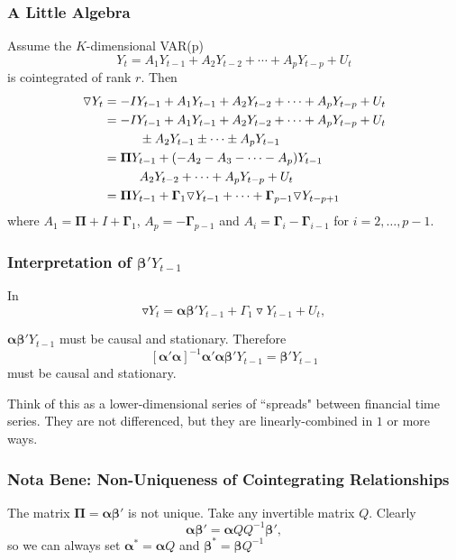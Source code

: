 \documentclass{beamer}
\begin{document}

\begin{frame}
\frametitle{A Little Algebra}

Assume the $K$-dimensional VAR(p)
$$
Y_t = A_1 Y_{t-1} + A_2 Y_{t-2} + \cdots + A_pY_{t-p} + U_t
$$
is cointegrated of rank $r$. Then 
\begin{align*}
\triangledown Y_t &= - IY_{t-1} + A_1 Y_{t-1} + A_2 Y_{t-2} + \cdots + A_pY_{t-p} + U_t\\
&= - IY_{t-1} + A_1 Y_{t-1} + A_2 Y_{t-2} + \cdots + A_pY_{t-p} + U_t \\
& \hspace{10mm} \pm A_2 Y_{t-1} \pm \cdots \pm A_p Y_{t-1} \\
&= \bm{\Pi} Y_{t-1} + (-A_2 - A_3 - \cdots - A_p) Y_{t-1} \\
& \hspace{10mm} A_2 Y_{t-2} + \cdots + A_p Y_{t-p} + U_t\\
&= \bm{\Pi} Y_{t-1} + \bm{\Gamma}_1\triangledown Y_{t-1} + \cdots + \bm{\Gamma}_{p-1} \triangledown Y_{t-p+1} 
\end{align*}
where $A_1 = \bm{\Pi} + I + \bm{\Gamma}_1$, $A_p = -\bm{\Gamma}_{p-1}$ and $A_i = \bm{\Gamma}_i - \bm{\Gamma}_{i-1}$ for $i=2,\ldots, p-1$.

\end{frame}


\begin{frame}
\frametitle{Interpretation of $\bm{\beta} ' Y_{t-1}$}

In
$$
\triangledown Y_t = \bm{\alpha} \bm{\beta} ' Y_{t-1} + \Gamma_1 \triangledown Y_{t-1} + U_t,
$$

$\bm{\alpha} \bm{\beta} ' Y_{t-1} $  must be causal and stationary. Therefore
$$ 
[\bm{\alpha}'\bm{\alpha}] ^{-1}\bm{\alpha}'\bm{\alpha} \bm{\beta} ' Y_{t-1} = \bm{\beta} ' Y_{t-1}
$$ 
must be causal and stationary. 
\newline

Think of this as a lower-dimensional series of ``spreads" between financial time series. They are not differenced, but they are linearly-combined in $1$ or more ways.

\end{frame}


\begin{frame}
\frametitle{Nota Bene: Non-Uniqueness of Cointegrating Relationships}

The matrix $\bm{\Pi} = \bm{\alpha}\bm{\beta}'$ is not unique. Take any invertible matrix $Q$. Clearly 
$$
\bm{\alpha}\bm{\beta}' = \bm{\alpha}Q Q^{-1}\bm{\beta}',
$$
so we can always set $\bm{\alpha}^* = \bm{\alpha}Q$ and $\bm{\beta}^* =\bm{\beta} Q^{-1}$


\end{frame}
\end{document}
